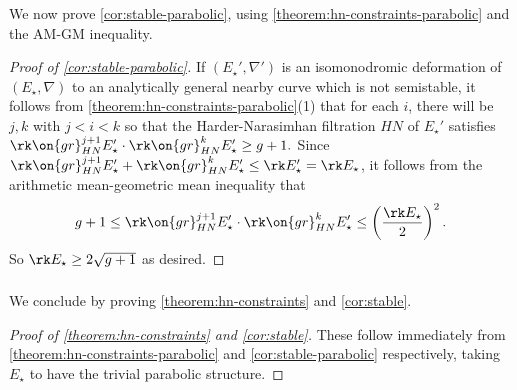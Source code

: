 \subsubsection{}
\label{subsubsection:corollary-proof}
We now prove \autoref{cor:stable-parabolic}, using
\autoref{theorem:hn-constraints-parabolic}
and the AM-GM inequality.
\begin{proof}[Proof of \autoref{cor:stable-parabolic}]

If $(E_\star', \nabla')$ is an isomonodromic deformation of $(E_\star,\nabla)$ to an
	analytically general nearby curve which is not semistable, it follows from
	\autoref{theorem:hn-constraints-parabolic}(1) that for each $i$, there will be $j,k$ with
	$j<i<k$ so that the Harder-Narasimhan filtration $HN$ of $E_\star'$ satisfies
$\rk \on{gr}^{j+1}_{HN}E_\star'\cdot \rk
	\on{gr}^k_{HN}E_\star'\geq g+1.$
	Since $\rk \on{gr}^{j+1}_{HN}E_\star' + \rk \on{gr}^k_{HN}E_\star' \leq \rk E_\star' = \rk
	E_\star$,
	it follows from the arithmetic mean-geometric mean inequality that
	$$g+1\leq \rk \on{gr}^{j+1}_{HN}E_\star'\cdot \rk \on{gr}^k_{HN}E_\star'\leq \left(\frac{\rk
E_\star}{2} \right)^2.$$
So
$\rk E_\star \geq 2 \sqrt{g+1}$ as desired.
\end{proof}

\subsubsection{}
\label{subsection:proof-intro-stable}
We conclude by proving \autoref{theorem:hn-constraints} and
\autoref{cor:stable}.
\begin{proof}[{Proof of \autoref{theorem:hn-constraints} and \autoref{cor:stable}}]
	These follow immediately from \autoref{theorem:hn-constraints-parabolic} and \autoref{cor:stable-parabolic} respectively, taking
	$E_\star$ to have the trivial parabolic structure.
\end{proof}
